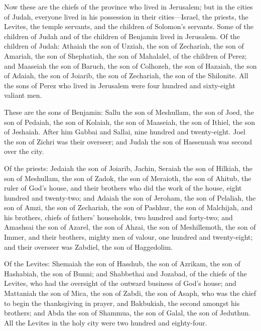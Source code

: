  Now these are the chiefs of the province who lived in
Jerusalem; but in the cities of Judah, everyone lived in his possession
in their cities---Israel, the priests, the Levites, the temple servants,
and the children of Solomon's servants.  Some of the
children of Judah and of the children of Benjamin lived in Jerusalem. Of
the children of Judah: Athaiah the son of Uzziah, the son of Zechariah,
the son of Amariah, the son of Shephatiah, the son of Mahalalel, of the
children of Perez;  and Maaseiah the son of Baruch, the son
of Colhozeh, the son of Hazaiah, the son of Adaiah, the son of Joiarib,
the son of Zechariah, the son of the Shilonite.  All the
sons of Perez who lived in Jerusalem were four hundred and sixty-eight
valiant men.

 These are the sons of Benjamin: Sallu the son of Meshullam,
the son of Joed, the son of Pedaiah, the son of Kolaiah, the son of
Maaseiah, the son of Ithiel, the son of Jeshaiah.  After him
Gabbai and Sallai, nine hundred and twenty-eight.  Joel the
son of Zichri was their overseer; and Judah the son of Hassenuah was
second over the city.

 Of the priests: Jedaiah the son of Joiarib, Jachin,
 Seraiah the son of Hilkiah, the son of Meshullam, the son
of Zadok, the son of Meraioth, the son of Ahitub, the ruler of God's
house,  and their brothers who did the work of the house,
eight hundred and twenty-two; and Adaiah the son of Jeroham, the son of
Pelaliah, the son of Amzi, the son of Zechariah, the son of Pashhur, the
son of Malchijah,  and his brothers, chiefs of fathers'
households, two hundred and forty-two; and Amashsai the son of Azarel,
the son of Ahzai, the son of Meshillemoth, the son of Immer,
 and their brothers, mighty men of valour, one hundred and
twenty-eight; and their overseer was Zabdiel, the son of Haggedolim.

 Of the Levites: Shemaiah the son of Hasshub, the son of
Azrikam, the son of Hashabiah, the son of Bunni;  and
Shabbethai and Jozabad, of the chiefs of the Levites, who had the
oversight of the outward business of God's house;  and
Mattaniah the son of Mica, the son of Zabdi, the son of Asaph, who was
the chief to begin the thanksgiving in prayer, and Bakbukiah, the second
amongst his brothers; and Abda the son of Shammua, the son of Galal, the
son of Jeduthun.  All the Levites in the holy city were two
hundred and eighty-four.

